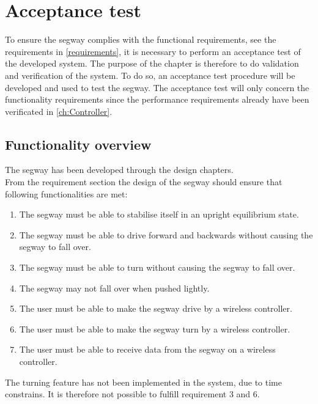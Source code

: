 \chapter{Acceptance test}

To ensure the segway complies with the functional requirements, see the requirements in \autoref{requirements}, it is necessary to perform an acceptance test of the developed system. The purpose of the chapter is therefore to do validation and verification of the system. To do so, an acceptance test procedure will be developed and used to test the segway. The acceptance test will only concern the functionality requirements since the performance requirements already have been verificated in \autoref{ch:Controller}.
\section{Functionality overview}
The segway has been developed through the design chapters.\\
From the requirement section the design of the segway should ensure that following functionalities are met:
\begin{enumerate}
\item The segway must be able to stabilise itself in an upright equilibrium state.
\item The segway must be able to drive forward and backwards without causing the segway to fall over.
\item The segway must be able to turn without causing the segway to fall over.
\item The segway may not fall over when pushed lightly.
\item The user must be able to make the segway drive by a wireless controller.
\item The user must be able to make the segway turn by a wireless controller.
\item The user must be able to receive data from the segway on a wireless controller.
\end{enumerate}
The turning feature has not been implemented in the system, due to time constrains. It is therefore not possible to fulfill requirement 3 and 6.

